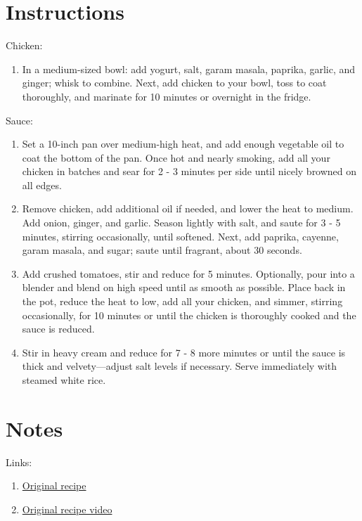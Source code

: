 \documentclass[11pt]{article}
\begin{document}
	\section*{Instructions}
	Chicken:
	\begin{enumerate}
		\item In a medium-sized bowl: add yogurt, salt, garam masala, paprika, garlic, and ginger; whisk to combine. Next, add chicken to your bowl, toss to coat thoroughly, and marinate for 10 minutes or overnight in the fridge.
	\end{enumerate}
	Sauce:
	\begin{enumerate}
		\item Set a 10-inch pan over medium-high heat, and add enough vegetable oil to coat the bottom of the pan. Once hot and nearly smoking, add all your chicken in batches and sear for 2 - 3 minutes per side until nicely browned on all edges.
		\item Remove chicken, add additional oil if needed, and lower the heat to medium. Add onion, ginger, and garlic. Season lightly with salt, and saute for 3 - 5 minutes, stirring occasionally, until softened. Next, add paprika, cayenne, garam masala, and sugar; saute until fragrant, about 30 seconds.
		\item Add crushed tomatoes, stir and reduce for 5 minutes. Optionally, pour into a blender and blend on high speed until as smooth as possible. Place back in the pot, reduce the heat to low, add all your chicken, and simmer, stirring occasionally, for 10 minutes or until the chicken is thoroughly cooked and the sauce is reduced.
		\item Stir in heavy cream and reduce for 7 - 8 more minutes or until the sauce is thick and velvety—adjust salt levels if necessary. Serve immediately with steamed white rice.
	\end{enumerate}

	\section*{Notes}
	Links:
	\begin{enumerate}
		\item \href{https://www.joshuaweissman.com/post/2-chicken-tikka-masala-but-cheaper}{Original recipe}
		\item\href{https://youtu.be/O5l1SMavklI}{Original recipe video}
	\end{enumerate}
\end{document}
